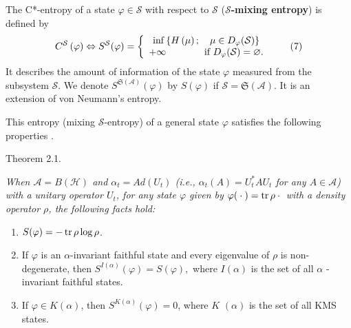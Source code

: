 \noindent The C*-entropy of a state   $  \varphi \in \mathcal{S} $  
with respect to  $  \mathcal{S} $   (\textbf{$  \boldsymbol{\mathcal{S}} $-mixing entropy}) is
defined by 
\begin{equation}
C^{\mathcal{S}}\left( \varphi \right) \Leftrightarrow S^{\mathcal{S}%
}(\varphi )=\left\{ 
\begin{array}{c}
\inf \left\{ H\left( \mu \right) ;\quad \mu \in D_{\varphi }(\mathcal{S}%
)\right\}    \\
+\infty \quad \qquad \quad \hbox{if }D_{\varphi }(\mathcal{S})=\varnothing.%
\end{array}%
\right.  
\tag{7}
\end{equation}%
It describes the amount of information of the state  $  \varphi  $   measured from
the subsystem  $  \mathcal{S} $. We denote  $  S^{\mathfrak{S}(\mathcal{A}%
)}(\varphi ) $   by  $  S(\varphi ) $   if  $  \mathcal{S}=\mathfrak{S}(\mathcal{A}) $. 
It is an extension of von Neumann's entropy.

This entropy (mixing  $  \mathcal{S} $-entropy) of a general state  $  \varphi  $  
satisfies the following properties \cite{nv:-O2}.  

{\small \sc Theorem 2.1.}{\it
 When  $  \mathcal{A}=B(\mathcal{H}) $   and  $  \alpha _{t}=Ad(U_{t}) $   (i.e.,  $  %
\alpha _{t}(A)=U_{t}^{\ast }AU_{t} $   for any  $  A\in \mathcal{A} $) with a
unitary operator  $  U_{t} $,   for any state  $  \varphi  $   given by  $  \varphi ({}\cdot{}
)=\mathop{\rm tr}\rho {}\cdot {} $   with a density operator  $  \rho  $,   the following
facts hold: 

\begin{enumerate}
\item[\rm (1)]  $  S(\varphi )=-\mathop{\rm tr}\rho \log \rho  $.

\item[\rm (2)] If  $  \varphi  $   is an  $  \alpha  $-invariant faithful state and every
eigenvalue of  $  \rho  $   is non-degenerate, then  $  S^{I(\alpha )}(\varphi
)=S(\varphi ), $   where  $  I( \alpha)  $   is the set of all  $  \alpha  $  %
-invariant faithful states.

\item[\rm (3)] If  $  \varphi \in K(\alpha ) $,   then  $  S^{K( \alpha)
}(\varphi )=0 $,   where  $  K $    $  ( \alpha)  $  is the set of all KMS
states.
\end{enumerate}
}


